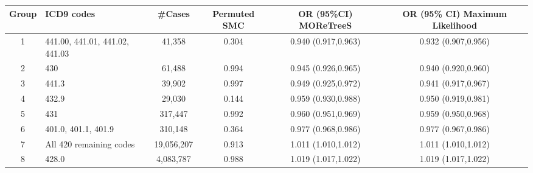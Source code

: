 \begin{tabular}{cp{6cm}cccc}
  \hline
Group & ICD9 codes & \#Cases & Permuted SMC & OR (95\%CI) MOReTreeS & OR (95\% CI) Maximum Likelihood \\ 
  \hline
1 & 441.00, 441.01, 441.02, 441.03 & 41,358 & 0.304 & 0.940 (0.917,0.963) & 0.932 (0.907,0.956) \\ 
  2 & 430 & 61,488 & 0.994 & 0.945 (0.926,0.965) & 0.940 (0.920,0.960) \\ 
  3 & 441.3 & 39,902 & 0.997 & 0.949 (0.925,0.972) & 0.941 (0.917,0.967) \\ 
  4 & 432.9 & 29,030 & 0.144 & 0.959 (0.930,0.988) & 0.950 (0.919,0.981) \\ 
  5 & 431 & 317,447 & 0.992 & 0.960 (0.951,0.969) & 0.959 (0.950,0.968) \\ 
  6 & 401.0, 401.1, 401.9 & 310,148 & 0.364 & 0.977 (0.968,0.986) & 0.977 (0.967,0.986) \\ 
  7 & All 420 remaining codes & 19,056,207 & 0.913 & 1.011 (1.010,1.012) & 1.011 (1.010,1.012) \\ 
  8 & 428.0 & 4,083,787 & 0.988 & 1.019 (1.017,1.022) & 1.019 (1.017,1.022) \\ 
   \hline
\end{tabular}

